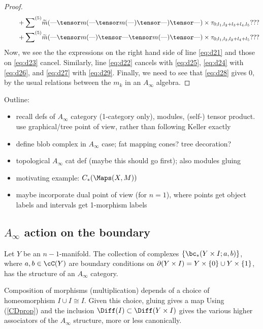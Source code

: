 \begin{proof}
\begin{align}
\label{eq:d28} & \qquad + \ssum{5} \tm(\T \tensor m(\T \tensor m(\T) \tensor \T) \tensor \T) \times \tau_{0;l_1,l_2+l_3+l_4,l_5} ??? \\
\label{eq:d29} & \qquad + \ssum{5} \tm(\T \tensor m(\T) \tensor \T \tensor m(\T) \tensor \T) \times \tau_{0;l_1,l_2,l_3+l_4+l_5} ???
\end{align}
Now, we see the the expressions on the right hand side of line \eqref{eq:d21} and those on \eqref{eq:d23} cancel. Similarly, line \eqref{eq:d22} cancels
with \eqref{eq:d25}, \eqref{eq:d24} with \eqref{eq:d26}, and \eqref{eq:d27} with \eqref{eq:d29}. Finally, we need to see that \eqref{eq:d28} gives $0$,
by the usual relations between the $m_k$ in an $A_\infty$ algebra.
\end{proof}


\bigskip

Outline:
\begin{itemize}
\item recall defs of $A_\infty$ category (1-category only), modules, (self-) tensor product.
use graphical/tree point of view, rather than following Keller exactly
\item define blob complex in $A_\infty$ case; fat mapping cones?  tree decoration?
\item topological $A_\infty$ cat def (maybe this should go first); also modules gluing
\item motivating example: $C_*(\Maps(X, M))$
\item maybe incorporate dual point of view (for $n=1$), where points get
object labels and intervals get 1-morphism labels
\end{itemize}


\subsection{$A_\infty$ action on the boundary}
\label{sec:boundary-action}%
Let $Y$ be an $n{-}1$-manifold.
The collection of complexes $\{\bc_*(Y\times I; a, b)\}$, where $a, b \in \cC(Y)$ are boundary
conditions on $\partial(Y\times I) = Y\times \{0\} \cup Y\times\{1\}$, has the structure
of an $A_\infty$ category.

Composition of morphisms (multiplication) depends of a choice of homeomorphism
$I\cup I \cong I$.  Given this choice, gluing gives a map
Using (\ref{CDprop}) and the inclusion $\Diff(I) \sub \Diff(Y\times I)$ gives the various
higher associators of the $A_\infty$ structure, more or less canonically.

